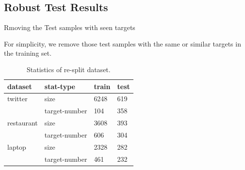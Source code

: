\documentclass[xcolor=dvipsnames]{beamer}
\begin{document}
\subsection{Robust Test Results}

\begin{frame}{Rmoving the Test samples with seen targets}
  
  For simplicity, we remove those test samples with the same or similar targets in the training set.



\begin{table}[]
  \centering
  \caption{Statistics of re-split dataset.}
  \begin{tabular}{llll}
  \hline
  dataset  & stat-type         & train & test \\ \hline
  twitter    & size          & 6248 & 619 \\ \hline
             & target-number & 104  & 358 \\ \hline
  restaurant & size          & 3608 & 393 \\ \hline
             & target-number & 606  & 304 \\ \hline
  laptop     & size          & 2328 & 282 \\ \hline
             & target-number & 461  & 232 \\ \hline
  \end{tabular}
\end{table}

\end{frame}
\end{document}
